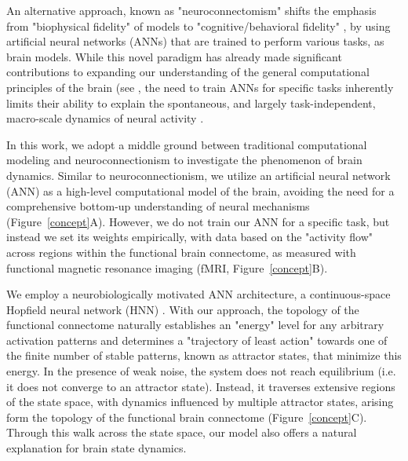 \documentclass{article}
\begin{document}
An alternative approach, known as "neuroconnectomism" \citep{doerig2023neuroconnectionist} shifts the
emphasis from "biophysical fidelity" of models to "cognitive/behavioral fidelity"
\citep{kriegeskorte2018cognitive}, by using artificial neural networks (ANNs) that are trained to
perform various tasks, as brain models.
While this novel paradigm has already made significant contributions to expanding our understanding of the general
computational principles of the brain (see \citep{doerig2023neuroconnectionist}, the need to train ANNs for
specific tasks inherently limits their ability to explain the spontaneous, and largely task-independent, macro-scale
dynamics of neural activity \citep{richards2019deep}.

In this work, we adopt a middle ground between traditional computational modeling and neuroconnectionism to investigate
the phenomenon of brain dynamics.
Similar to neuroconnectionism, we utilize an artificial neural network (ANN) as a high-level computational model of the brain, avoiding the need for a comprehensive bottom-up understanding of neural mechanisms (Figure~\ref{concept}A).
However, we do not train our ANN for a specific task, but instead we set its weights empirically, with data based
on the "activity flow" \citep{cole2016activity, ito2017cognitive}
across regions within the functional brain connectome, as measured with functional magnetic resonance imaging
(fMRI, Figure~\ref{concept}B).

We employ a neurobiologically motivated ANN architecture, a continuous-space Hopfield neural network (HNN) \citep{hopfield1982neural, krotov2023new}.
With our approach, the topology of the functional connectome naturally establishes an "energy" level for any
arbitrary activation patterns and determines a "trajectory of least action" towards one of the finite number of stable patterns, known as
attractor states, that minimize this energy.
In the presence of weak noise, the system does not reach equilibrium (i.e. it does not converge to an attractor state).
Instead, it traverses extensive regions of the state space, with dynamics influenced by multiple attractor states,
arising form the topology of the functional brain connectome (Figure~\ref{concept}C).
Through this walk across the state space, our model also offers a natural explanation for brain state dynamics.
\end{document}
